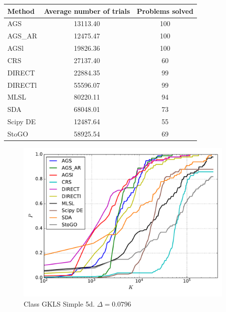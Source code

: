 \documentclass[a4paper]{article}
\begin{document}
\begin{tabular}{lcc}
\hline
 Method   &  Average number of trials  &  Problems solved  \\
\hline
 AGS      &          13113.40          &        100        \\
 AGS\_AR   &          12475.47          &        100        \\
 AGSl     &          19826.36          &        100        \\
 CRS      &          27137.40          &        60         \\
 DIRECT   &          22884.35          &        99         \\
 DIRECTl  &          55596.07          &        99         \\
 MLSL     &          80220.11          &        94         \\
 SDA      &          68048.01          &        73         \\
 Scipy DE &          12487.64          &        55         \\
 StoGO    &          58925.54          &        69         \\
\hline
\end{tabular}
\begin{figure}[H]
  \center
  \includegraphics[width=0.95\textwidth]{../experiments/gklss5d_serg/cmc.pdf}
  \caption{Class GKLS Simple 5d. $\Delta=0.0796$}

\end{figure}
\end{document}
